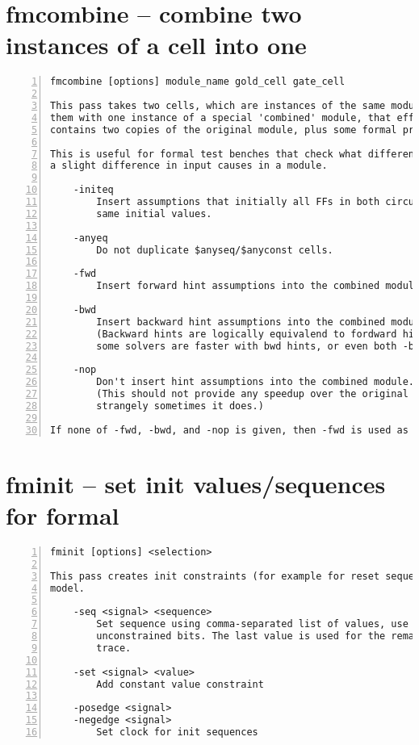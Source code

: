 \section{fmcombine -- combine two instances of a cell into one}
\label{cmd:fmcombine}
\begin{lstlisting}[numbers=left,frame=single]
    fmcombine [options] module_name gold_cell gate_cell

This pass takes two cells, which are instances of the same module, and replaces
them with one instance of a special 'combined' module, that effectively
contains two copies of the original module, plus some formal properties.

This is useful for formal test benches that check what differences in behavior
a slight difference in input causes in a module.

    -initeq
        Insert assumptions that initially all FFs in both circuits have the
        same initial values.

    -anyeq
        Do not duplicate $anyseq/$anyconst cells.

    -fwd
        Insert forward hint assumptions into the combined module.

    -bwd
        Insert backward hint assumptions into the combined module.
        (Backward hints are logically equivalend to fordward hits, but
        some solvers are faster with bwd hints, or even both -bwd and -fwd.)

    -nop
        Don't insert hint assumptions into the combined module.
        (This should not provide any speedup over the original design, but
        strangely sometimes it does.)

If none of -fwd, -bwd, and -nop is given, then -fwd is used as default.
\end{lstlisting}

\section{fminit -- set init values/sequences for formal}
\label{cmd:fminit}
\begin{lstlisting}[numbers=left,frame=single]
    fminit [options] <selection>

This pass creates init constraints (for example for reset sequences) in a formal
model.

    -seq <signal> <sequence>
        Set sequence using comma-separated list of values, use 'z for
        unconstrained bits. The last value is used for the remainder of the
        trace.

    -set <signal> <value>
        Add constant value constraint

    -posedge <signal>
    -negedge <signal>
        Set clock for init sequences
\end{lstlisting}

